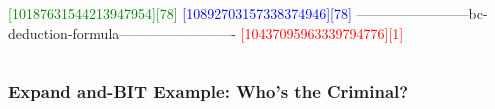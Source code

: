 \documentclass{beamer}
\begin{document}
\begin{frame}[fragile]
\begin{columns}
\column{2in}

    {\Tiny
\begin{semiverbatim}
\textcolor{green}{[10187631544213947954][78]} \textcolor{blue}{[10892703157338374946][78]}
------------------------bc-deduction-formula-------------------------
              \textcolor{red}{[10437095963339794776][1]}
\end{semiverbatim}
    }

  \end{columns}

\end{frame}

\begin{frame}[fragile]
\frametitle{Expand and-BIT Example: Who's the Criminal?}

  \begin{columns}
    \column{1.5in}


\end{columns}
\end{frame}
\end{document}
